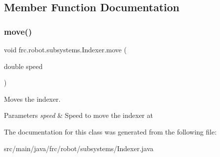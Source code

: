 \subsection{Member Function Documentation}
\mbox{\label{classfrc_1_1robot_1_1subsystems_1_1_indexer_ac0dd21785d508a1ed3fcf084fccc05bc}} 
\subsubsection{\texorpdfstring{move()}{move()}}
{\footnotesize\ttfamily void frc.\+robot.\+subsystems.\+Indexer.\+move (\begin{DoxyParamCaption}\item[{double}]{speed }\end{DoxyParamCaption})\hspace{0.3cm}{\ttfamily [inline]}}



Moves the indexer. 


\begin{DoxyParams}{Parameters}
{\em speed} & Speed to move the indexer at \\
\hline
\end{DoxyParams}


The documentation for this class was generated from the following file\+:\begin{DoxyCompactItemize}
\item 
src/main/java/frc/robot/subsystems/Indexer.\+java\end{DoxyCompactItemize}
